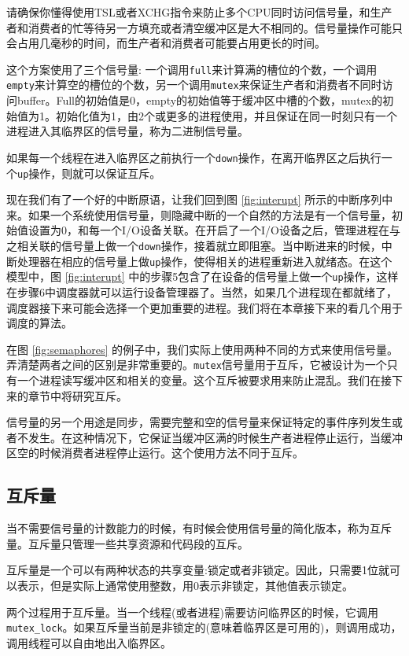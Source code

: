 	请确保你懂得使用TSL或者XCHG指令来防止多个CPU同时访问信号量，和生产者和消费者的忙等待另一方填充或者清空缓冲区是大不相同的。信号量操作可能只会占用几毫秒的时间，而生产者和消费者可能要占用更长的时间。
	
	这个方案使用了三个信号量: 一个调用\texttt{full}来计算满的槽位的个数，一个调用\texttt{empty}来计算空的槽位的个数，另一个调用\texttt{mutex}来保证生产者和消费者不同时访问buffer。Full的初始值是0，empty的初始值等于缓冲区中槽的个数，mutex的初始值为1。初始化值为1，由2个或更多的进程使用，并且保证在同一时刻只有一个进程进入其临界区的信号量，称为二进制信号量。
	
	如果每一个线程在进入临界区之前执行一个\texttt{down}操作，在离开临界区之后执行一个\texttt{up}操作，则就可以保证互斥。
	
	现在我们有了一个好的中断原语，让我们回到图 \ref{fig:interupt} 所示的中断序列中来。如果一个系统使用信号量，则隐藏中断的一个自然的方法是有一个信号量，初始值设置为0，和每一个I/O设备关联。在开启了一个I/O设备之后，管理进程在与之相关联的信号量上做一个\texttt{down}操作，接着就立即阻塞。当中断进来的时候，中断处理器在相应的信号量上做\texttt{up}操作，使得相关的进程重新进入就绪态。在这个模型中，图 \ref{fig:interupt} 中的步骤5包含了在设备的信号量上做一个\texttt{up}操作，这样在步骤6中调度器就可以运行设备管理器了。当然，如果几个进程现在都就绪了，调度器接下来可能会选择一个更加重要的进程。我们将在本章接下来的看几个用于调度的算法。
	
	在图 \ref{fig:semaphores} 的例子中，我们实际上使用两种不同的方式来使用信号量。弄清楚两者之间的区别是非常重要的。\texttt{mutex}信号量用于互斥，它被设计为一个只有一个进程读写缓冲区和相关的变量。这个互斥被要求用来防止混乱。我们在接下来的章节中将研究互斥。
	
	信号量的另一个用途是同步，需要完整和空的信号量来保证特定的事件序列发生或者不发生。在这种情况下，它保证当缓冲区满的时候生产者进程停止运行，当缓冲区空的时候消费者进程停止运行。这个使用方法不同于互斥。
	
	\subsection{互斥量}
	
	当不需要信号量的计数能力的时候，有时候会使用信号量的简化版本，称为互斥量。互斥量只管理一些共享资源和代码段的互斥。
	
	互斥量是一个可以有两种状态的共享变量:锁定或者非锁定。因此，只需要1位就可以表示，但是实际上通常使用整数，用0表示非锁定，其他值表示锁定。
	
	两个过程用于互斥量。当一个线程(或者进程)需要访问临界区的时候，它调用\texttt{mutex\_lock}。如果互斥量当前是非锁定的(意味着临界区是可用的)，则调用成功，调用线程可以自由地出入临界区。
	
